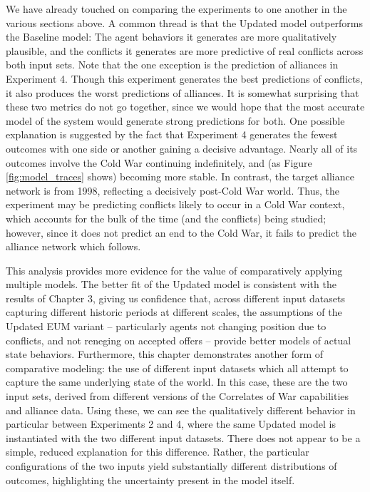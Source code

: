 We have already touched on comparing the experiments to one another in the various sections above. A common thread is that the Updated model outperforms the Baseline model: The agent behaviors it generates are more qualitatively plausible, and the conflicts it generates are more predictive of real conflicts across both input sets. Note that the one exception is the prediction of alliances in Experiment 4. Though this experiment generates the best predictions of conflicts, it also produces the worst predictions of alliances. It is somewhat surprising that these two metrics do not go together, since we would hope that the most accurate model of the system would generate strong predictions for both. One possible explanation is suggested by the fact that Experiment 4 generates the fewest outcomes with one side or another gaining a decisive advantage. Nearly all of its outcomes involve the Cold War continuing indefinitely, and (as Figure \ref{fig:model_traces} shows) becoming more stable. In contrast, the target alliance network is from 1998, reflecting a decisively post-Cold War world. Thus, the experiment may be predicting conflicts likely to occur in a Cold War context, which accounts for the bulk of the time (and the conflicts) being studied; however, since it does not predict an end to the Cold War, it fails to predict the alliance network which follows. 

This analysis provides more evidence for the value of comparatively applying multiple models. The better fit of the Updated model is consistent with the results of Chapter 3, giving us confidence that, across different input datasets capturing different historic periods at different scales, the assumptions of the Updated EUM variant -- particularly agents not changing position due to conflicts, and not reneging on accepted offers -- provide better models of actual state behaviors. Furthermore, this chapter demonstrates another form of comparative modeling: the use of different input datasets which all attempt to capture the same underlying state of the world. In this case, these are the two input sets, derived from different versions of the Correlates of War capabilities and alliance data. Using these, we can see the qualitatively different behavior in particular between Experiments 2 and 4, where the same Updated model is instantiated with the two different input datasets. There does not appear to be a simple, reduced explanation for this difference. Rather, the particular configurations of the two inputs yield substantially different distributions of outcomes, highlighting the uncertainty present in the model itself.

